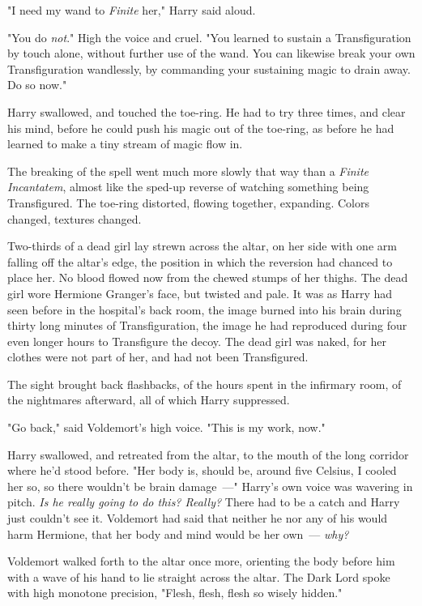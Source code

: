 "I need my wand to \emph{Finite} her," Harry said aloud.

"You do \emph{not}." High the voice and cruel. "You learned to sustain a
Transfiguration by touch alone, without further use of the wand. You can
likewise break your own Transfiguration wandlessly, by commanding your
sustaining magic to drain away. Do so now."

Harry swallowed, and touched the toe-ring. He had to try three times, and clear
his mind, before he could push his magic out of the toe-ring, as before he had
learned to make a tiny stream of magic flow in.

The breaking of the spell went much more slowly that way than a \emph{Finite
Incantatem}, almost like the sped-up reverse of watching something being
Transfigured. The toe-ring distorted, flowing together, expanding. Colors
changed, textures changed.

Two-thirds of a dead girl lay strewn across the altar, on her side with one arm
falling off the altar's edge, the position in which the reversion had chanced
to place her. No blood flowed now from the chewed stumps of her thighs. The
dead girl wore Hermione Granger's face, but twisted and pale. It was as Harry
had seen before in the hospital's back room, the image burned into his brain
during thirty long minutes of Transfiguration, the image he had reproduced
during four even longer hours to Transfigure the decoy. The dead girl was
naked, for her clothes were not part of her, and had not been Transfigured.

The sight brought back flashbacks, of the hours spent in the infirmary room, of
the nightmares afterward, all of which Harry suppressed.

"Go back," said Voldemort's high voice. "This is my work, now."

Harry swallowed, and retreated from the altar, to the mouth of the long
corridor where he'd stood before. "Her body is, should be, around five Celsius,
I cooled her so, so there wouldn't be brain damage~---" Harry's own voice was
wavering in pitch. \emph{Is he really going to do this? Really?} There had to
be a catch and Harry just couldn't see it. Voldemort had said that neither he
nor any of his would harm Hermione, that her body and mind would be her
own~--- \emph{why?}

Voldemort walked forth to the altar once more, orienting the body before him
with a wave of his hand to lie straight across the altar. The Dark Lord spoke
with high monotone precision, "Flesh, flesh, flesh so wisely hidden."

